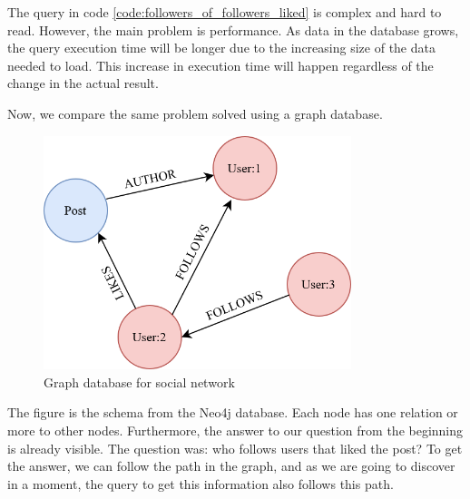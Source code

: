 
The query in code \ref{code:followers_of_followers_liked} is complex and hard to read. However, the main problem is performance.
As data in the database grows, the query execution time will be longer due to the increasing size of the data needed to load.
This increase in execution time will happen regardless of the change in the actual result.

Now, we compare the same problem solved using a graph database.

\begin{figure}[H]
	\centering
	\includegraphics[width=0.8\textwidth]{content/graph_example.png}
	\caption{Graph database for social network}
	\label{fig:graphscheme}
\end{figure}

The figure \label{fig:graphscheme} is the schema from the Neo4j database.
Each node has one relation or more to other nodes.
Furthermore, the answer to our question from the beginning is already visible. The question was: who follows users that liked the post?
To get the answer, we can follow the path in the graph, and as we are going to discover in a moment, the query to get this information also follows this path.


